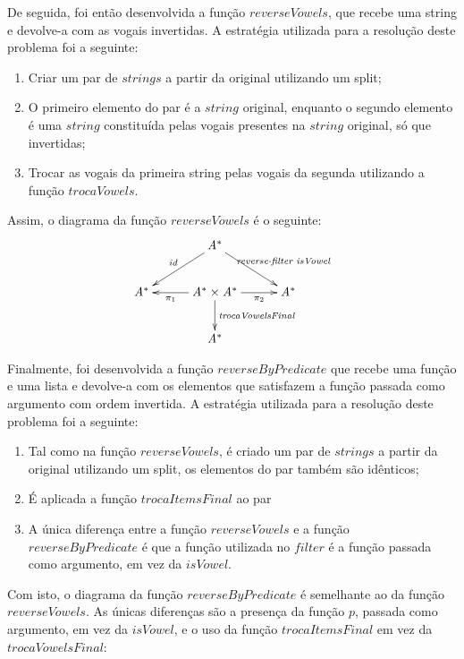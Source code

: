 \documentclass[11pt, a4paper, fleqn]{article}
\newcommand{\Conid}[1]{\mathit{#1}}
\newcommand{\Varid}[1]{\mathit{#1}}
\begin{document}
De seguida, foi então desenvolvida a função $reverseVowels$, que recebe uma string e devolve-a com as vogais invertidas.
A estratégia utilizada para a resolução deste problema foi a seguinte:
\begin{enumerate}
    \item Criar um par de $strings$ a partir da original utilizando um split;
    \item O primeiro elemento do par é a $string$ original, enquanto o segundo elemento é uma $string$ constituída pelas vogais presentes na $string$ original, só que invertidas;
    \item Trocar as vogais da primeira string pelas vogais da segunda utilizando a função $trocaVowels$.
\end{enumerate}

Assim, o diagrama da função $reverseVowels$ é o seguinte:
\begin{eqnarray*}
\xymatrix@C=1cm{
&
        \ensuremath{\Conid{A}}^*
            \ar[dl]_-{\ensuremath{\Varid{id}}}
            \ar[dr]^-{\ensuremath{\Varid{reverse}\comp \Varid{filter}\;\Varid{isVowel}}}
&
\\
        \ensuremath{\Conid{A}}^*
&
        \ensuremath{\Conid{A}}^* \ensuremath{\times} \ensuremath{\Conid{A}}^*
            \ar[l]^-{\ensuremath{\p1}}
            \ar[r]_-{\ensuremath{\p2}}
            \ar[d]^-{\ensuremath{\Varid{trocaVowelsFinal}}}
&
        \ensuremath{\Conid{A}}^*
\\
&
        \ensuremath{\Conid{A}}^*
&
    }
\end{eqnarray*}

Finalmente, foi desenvolvida a função $reverseByPredicate$ que recebe uma função e uma lista e devolve-a com os elementos que satisfazem a função passada como argumento com ordem invertida. 
A estratégia utilizada para a resolução deste problema foi a seguinte:
\begin{enumerate}
    \item Tal como na função $reverseVowels$, é criado um par de $strings$ a partir da original utilizando um split, os elementos do par também são idênticos;
    \item É aplicada a função $trocaItemsFinal$ ao par
    \item A única diferença entre a função $reverseVowels$ e a função $reverseByPredicate$ é que a função utilizada no $filter$ é a função passada como argumento, em vez da $isVowel$.
\end{enumerate}    

Com isto, o diagrama da função $reverseByPredicate$ é semelhante ao da função $reverseVowels$. As únicas diferenças são a presença da função $p$, passada como argumento, em vez da $isVowel$, e o uso da função $trocaItemsFinal$ em vez da $trocaVowelsFinal$:
\end{document}
